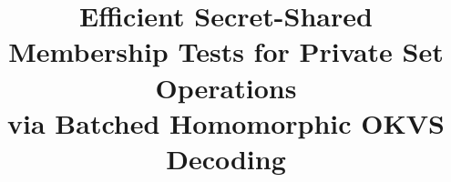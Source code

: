 

\date{}

\title{\Large \bf Efficient Secret-Shared Membership Tests for Private Set Operations \\ via Batched Homomorphic OKVS Decoding}


\maketitle


